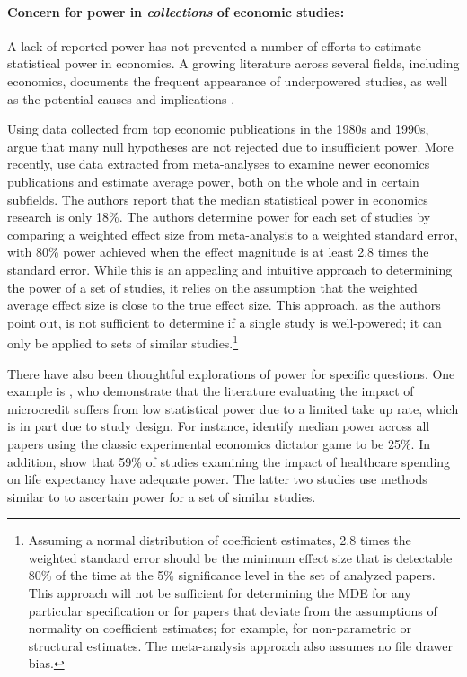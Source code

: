 \documentclass[12pt]{article}%
\begin{document}
\paragraph{Concern for power in \emph{collections} of economic studies:} 
A lack of reported power has not prevented a number of efforts to estimate statistical power in economics.  
A growing literature across several fields, including economics, documents the frequent appearance of underpowered studies, as well as the potential causes and implications \citep{Button2013,Maxwell2004,Ioannidis2005a,Ioannidis2017}.

Using data collected from top economic publications in the 1980s and 1990s, \citet{DeLong1992} argue that many null hypotheses are not rejected due to insufficient power.  
More recently, \citet{Ioannidis2017} use data extracted from meta-analyses to examine  newer economics publications and estimate average power, both on the whole and in certain subfields. 
The authors report that the median statistical power in economics research is only 18\%. 
The authors determine power for each set of studies by comparing a weighted effect size from meta-analysis to a weighted standard error, with 80\% power achieved when the effect magnitude is at least 2.8 times the  standard error. 
While this is an appealing and intuitive approach to determining the power of a set of studies, it relies on the assumption that the weighted average effect size is close to the true effect size. 
This approach, as the authors point out, is not sufficient to determine if a single study is well-powered; it can only be applied to sets of similar studies.\footnote{Assuming a normal distribution of coefficient estimates, 2.8 times the weighted standard error should be the minimum effect size that is detectable 80\% of the time at the 5\% significance level in the set of analyzed papers. 
This approach will not be sufficient for determining the MDE for any particular specification or for papers that deviate from the assumptions of normality on coefficient estimates; for example, for non-parametric or structural estimates. The meta-analysis approach also assumes no file drawer bias.}

There have also been thoughtful explorations of power for specific questions. 
One example is \citet{Banerjee2015}, who demonstrate that the literature evaluating the impact of microcredit suffers from low statistical power due to a limited take up rate, which is in part due to study design. 
For instance, \citet{Zhang2013} identify median power across all papers using the classic experimental economics dictator game to be 25\%.
In addition, \citet{Gallet2017} show that 59\% of studies examining the impact of healthcare spending on life expectancy have  adequate power. 
The latter two studies use methods similar to \citet{Ioannidis2017} to ascertain power for a set of similar studies.
 
\end{document}
